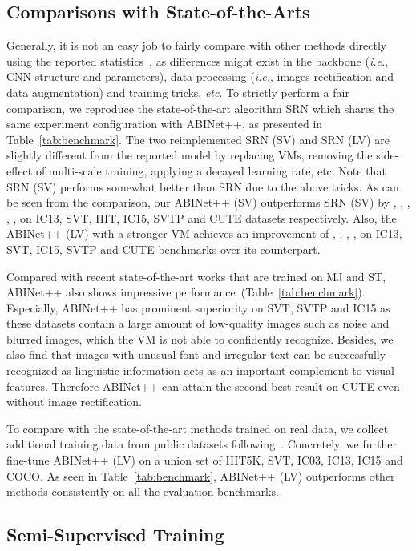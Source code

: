 \documentclass[10pt,journal,compsoc]{IEEEtran}
\def\ie{{\it i.e.}\xspace}
\def\etc{{\it etc}\xspace}
\begin{document}
\subsection{Comparisons with State-of-the-Arts}


 Generally, it is not an easy job to fairly compare with other methods directly using the reported statistics~\cite{baek2019wrong}, as differences might exist in the backbone (\ie, CNN structure and parameters), data processing (\ie, images rectification and data augmentation) and training tricks, \etc. To strictly perform a fair comparison, we reproduce the state-of-the-art algorithm SRN which shares the same experiment configuration with ABINet++, as presented in Table~\ref{tab:benchmark}. The two reimplemented SRN (SV) and SRN (LV) are slightly different from the reported model by replacing VMs, removing the side-effect of multi-scale training, applying a decayed learning rate, etc. Note that SRN (SV) performs somewhat better than SRN due to the above tricks. As can be seen from the comparison, our ABINet++ (SV) outperforms SRN (SV) by , , , , ,  on IC13, SVT, IIIT, IC15, SVTP and CUTE datasets respectively. Also, the ABINet++ (LV) with a stronger VM achieves an improvement of , , , ,  on IC13, SVT, IC15, SVTP and CUTE benchmarks over its counterpart.
 
 Compared with recent state-of-the-art works that are trained on MJ and ST, ABINet++ also shows impressive performance~(Table~\ref{tab:benchmark}). Especially, ABINet++ has prominent superiority on SVT, SVTP and IC15 as these datasets contain a large amount of low-quality images such as noise and blurred images, which the VM is not able to confidently recognize. Besides, we also find that images with unusual-font and irregular text can be successfully recognized as linguistic information acts as an important complement to visual features. Therefore ABINet++ can attain the second best result on CUTE even without image rectification.

To compare with the state-of-the-art methods trained on real data, we collect additional training data from public datasets following~\cite{qiao2021pimnet}. Concretely, we further fine-tune ABINet++ (LV) on a union set of IIIT5K, SVT, IC03, IC13, IC15 and COCO. As seen in Table~\ref{tab:benchmark}, ABINet++ (LV) outperforms other methods consistently on all the evaluation benchmarks.

\subsection{Semi-Supervised Training}
\end{document}

